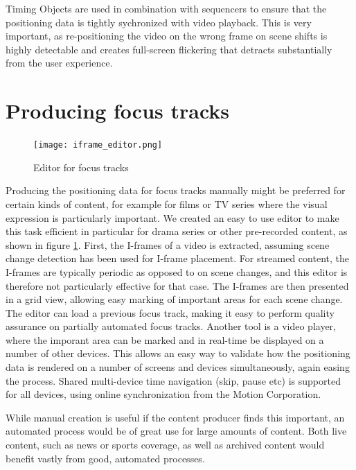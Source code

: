 \documentclass[sigconf, review=false]{acmart}
\begin{document}
Timing Objects \cite{Arntzen2018,timingobject} are used in combination with
sequencers \cite{sequencer} to ensure that the positioning data is tightly
sychronized with video playback. This is very important, as re-positioning
the video on the wrong frame on scene shifts is highly detectable and creates
full-screen flickering that detracts substantially from the user experience.


\section{Producing focus tracks}

\begin{figure}
\begin{center}
\texttt{[image: iframe\_editor.png]}
\caption{Editor for focus tracks}
\label{iframe_editor}
\end{center}
\end{figure}

Producing the positioning data for focus tracks manually might be preferred
for certain kinds of content, for example for films or TV series where the
visual expression is particularly important. We created an easy to use editor
to make this task efficient in particular for drama series or other
pre-recorded content, as shown in figure \ref{iframe_editor}. First, the
I-frames of a video is extracted, assuming scene change detection has been
used for I-frame placement. For streamed content, the I-frames are typically
periodic as opposed to on scene changes, and this editor is therefore not
particularly effective for that case. The I-frames are then presented in a
grid view, allowing easy marking of important areas for each scene change.
The editor can load a previous focus track, making it easy to perform quality
assurance on partially automated focus tracks. Another tool is a video
player, where the imporant area can be marked and in real-time be displayed
on a number of other devices. This allows an easy way to validate how the
positioning data is rendered on a number of screens and devices
simultaneously, again easing the process. Shared multi-device time navigation
(skip, pause etc) is supported for all devices, using online synchronization
from the Motion Corporation\cite{inMotion}.

While manual creation is useful if the content producer finds this important,
an automated process would be of great use for large amounts of content. Both
live content, such as news or sports coverage, as well as archived content
would benefit vastly from good, automated processes.
\end{document}
